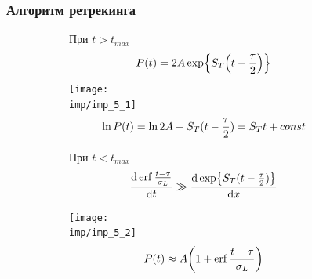 \documentclass[10pt,pdf,hyperref={unicode}, dvipsnames]{beamer}
\begin{document}

\begin{frame}
\frametitle{Алгоритм ретрекинга}
\vskip -3pt
\def\imp{fig/retracking}
\begin{figure}
    \centering
    \begin{subfigure}{0.49\linewidth}
    При $t > t_{max}$ 
    \begin{equation}
        P(t) = 2A\exp{S_T\qty(t - \frac{\tau}{2})}
    \end{equation}
        \centering
        \texttt{[image: \\imp/imp\_5\_1]}
        \begin{equation}
            \footnotesize
            \ln P(t) = \ln 2A + S_T(t - \frac{\tau}{2}) = S_T t + const
        \end{equation}
    \end{subfigure}
    \hfill
    \begin{subfigure}{0.49\linewidth}
        При $t < t_{max}$ 
        \begin{equation}
            \dv{\erf\frac{t - \tau}{\sigma_L}}{t} \gg 
            \dv{\exp{S_T(t - \frac{\tau}{2})}}{x}
        \end{equation}

        \centering
        \texttt{[image: \\imp/imp\_5\_2]}
        \begin{equation}
            \footnotesize
            P(t) \approx A\qty(1 + \erf\frac{t - \tau}{\sigma_L})
        \end{equation}
    \end{subfigure}

\end{figure}
\end{frame}
\end{document}
